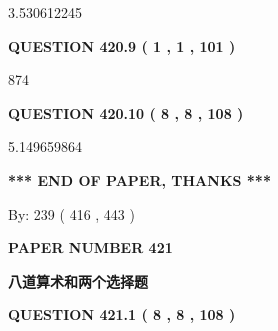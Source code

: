 \documentclass{ctexart}
\begin{document}
3.530612245
 
 
  
\vspace{0.2in}
  
{\textbf{\Large{QUESTION
420.9 
 ( 1 , 1 , 101 )
}}}
  
  
 
 
\noindent{}

874
 
 
  
\vspace{0.2in}
  
{\textbf{\Large{QUESTION
420.10 
 ( 8 , 8 , 108 )
}}}
  
  
 
 
\noindent{}

5.149659864
 
 
   
   
 \vspace{0.2in}
 
   
   
   
   
\vspace{1.0in} 
{\textbf{\large{ *** END OF PAPER, THANKS *** }}} 
   
   
\hspace{1.0in} By: 
 239 ( 416 ,  443 )
   
   
   
   
\newpage 
\setcounter{page}{ 
   421001 } 
   
   
   
   
 {\textbf{ \Large{ PAPER NUMBER  421  }}}
   
   
\vspace{0.2in}
   
   
   
   
   
   
 \vspace{0.2in}
{\LARGE {\textbf{ 八道算术和两个选择题}}}
   
   
  
\vspace{0.2in}
  
{\textbf{\Large{QUESTION
421.1 
 ( 8 , 8 , 108 )
}}}
  
  
 
 
\noindent{}
\end{document}
